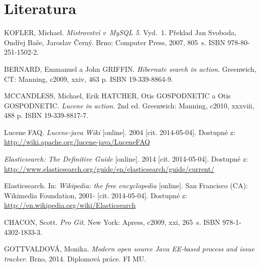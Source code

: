 \documentclass[11pt,oneside]{fithesis2}
\begin{document}
\begingroup
\def\tmpchapter{0}
\renewcommand{\chaptername}{}
\renewcommand{\thechapter}{}
\chapter{Literatura}
\renewcommand{\chapter}[2]{}%

\begin{thebibliography}{1}

KOFLER, Michael. \textit{Mistrovství v~MySQL 5}. Vyd.~1. Překlad Jan Svoboda, Ondřej Baše, Jaroslav Černý. Brno: Computer Press, 2007, 805~s. ISBN 978-80-251-1502-2. 

BERNARD, Emmanuel a John GRIFFIN. \textit{Hibernate search in action}. Greenwich, CT: Manning, c2009, xxiv, 463 p. ISBN 19-339-8864-9. 

MCCANDLESS, Michael, Erik HATCHER, Otis GOSPODNETIC a Otis GOSPODNETIC. \textit{Lucene in action}. 2nd ed. Greenwich: Manning, c2010, xxxviii, 488 p. ISBN 19-339-8817-7. 

Lucene FAQ. \textit{Lucene-java Wiki} [online]. 2004 [cit. 2014-05-04]. Dostupné z: \url{http://wiki.apache.org/lucene-java/LuceneFAQ}

\textit{Elasticsearch: The Definitive Guide} [online]. 2014 [cit. 2014-05-04]. Dostupné z: \url{http://www.elasticsearch.org/guide/en/elasticsearch/guide/current/}

Elasticsearch. In: \textit{Wikipedia: the free encyclopedia} [online]. San Francisco (CA): Wikimedia Foundation, 2001- [cit. 2014-05-04]. Dostupné z: \url{http://en.wikipedia.org/wiki/Elasticsearch}

CHACON, Scott. \textit{Pro Git}. New York: Apress, c2009, xxi, 265~s. ISBN 978-1-4302-1833-3. 

GOTTVALDOVÁ, Monika. \textit{Modern open source Java EE-based process and issue tracker}. Brno, 2014. Diplomová práce. FI MU.


\end{thebibliography}

\endgroup

\appendix

\end{document}
